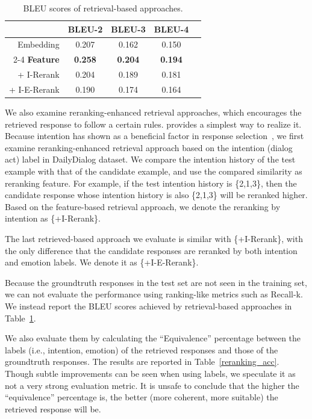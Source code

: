 \documentclass[11pt,letterpaper]{article}
\begin{document}
\begin{table}[h]
\centering
\begin{tabular}{rcccc}
\toprule
& BLEU-2 & BLEU-3 & BLEU-4 \\
\midrule
Embedding & 0.207&0.162& 0.150 \\\cline{2-4}
\bf{Feature}& \bf{0.258}&\bf{0.204}& \bf{0.194} \\
+ I-Rerank & 0.204&0.189&0.181 \\%
+ I-E-Rerank&0.190&0.174& 0.164 \\
\bottomrule
\end{tabular}
\caption{BLEU scores of retrieval-based approaches.}
\label{retrieval_bleu}
\end{table}

 We also examine reranking-enhanced retrieval approaches, which encourages the retrieved response to follow a certain rules. \citet{luocombination} provides a simplest way to realize it. Because intention has shown as a beneficial factor in response selection~\cite{otsuka2017utterance}, we first examine reranking-enhanced retrieval approach based on the intention (dialog act) label in DailyDialog dataset. We compare the intention history of the test example with that of the candidate example, and use the compared similarity as reranking feature. For example, if the test intention history is \{2,1,3\}, then the candidate response whose intention history is also \{2,1,3\} will be reranked higher. Based on the feature-based retrieval approach, we denote the reranking by intention as \{+I-Rerank\}.

 The last retrieved-based approach we evaluate is similar with \{+I-Rerank\}, with the only difference that the candidate responses are reranked by both intention and emotion labels. We denote it as \{+I-E-Rerank\}.

Because the groundtruth responses in the test set are not seen in the training set, we can not evaluate the performance using ranking-like metrics such as Recall-k. We instead report the BLEU scores achieved by retrieval-based approaches in Table~\ref{retrieval_bleu}. 

We also evaluate them by calculating the ``Equivalence'' percentage between the labels (i.e., intention, emotion) of the retrieved responses and those of the groundtruth responses. The results are reported in Table~\ref{reranking_acc}. Though subtle improvements can be seen when using labels, we speculate it as not a very strong evaluation metric. It is unsafe to conclude that the higher the ``equivalence'' percentage is, the better (more coherent, more suitable) the retrieved response will be. 
\end{document}
